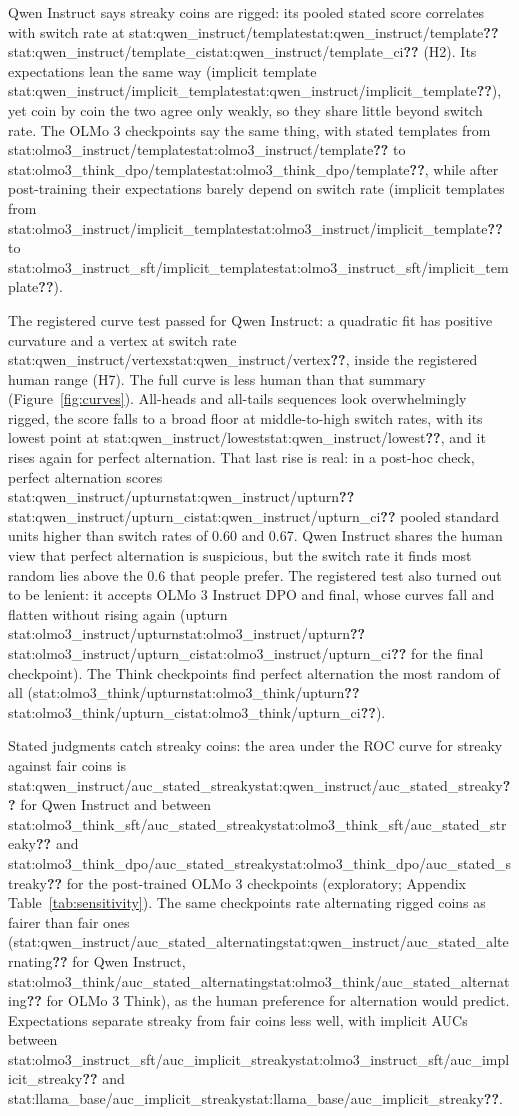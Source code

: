 \documentclass[11pt]{article}
\newcommand{\stat}[1]{\ifcsname stat:#1\endcsname\csname stat:#1\endcsname\else\textbf{??}\fi}
\begin{document}
Qwen Instruct says streaky coins are rigged: its pooled stated score correlates with switch rate at \stat{qwen_instruct/template} \stat{qwen_instruct/template_ci} (H2). Its expectations lean the same way (implicit template \stat{qwen_instruct/implicit_template}), yet coin by coin the two agree only weakly, so they share little beyond switch rate. The OLMo 3 checkpoints say the same thing, with stated templates from \stat{olmo3_instruct/template} to \stat{olmo3_think_dpo/template}, while after post-training their expectations barely depend on switch rate (implicit templates from \stat{olmo3_instruct/implicit_template} to \stat{olmo3_instruct_sft/implicit_template}).

The registered curve test passed for Qwen Instruct: a quadratic fit has positive curvature and a vertex at switch rate \stat{qwen_instruct/vertex}, inside the registered human range (H7). The full curve is less human than that summary (Figure~\ref{fig:curves}). All-heads and all-tails sequences look overwhelmingly rigged, the score falls to a broad floor at middle-to-high switch rates, with its lowest point at \stat{qwen_instruct/lowest}, and it rises again for perfect alternation. That last rise is real: in a post-hoc check, perfect alternation scores \stat{qwen_instruct/upturn} \stat{qwen_instruct/upturn_ci} pooled standard units higher than switch rates of 0.60 and 0.67. Qwen Instruct shares the human view that perfect alternation is suspicious, but the switch rate it finds most random lies above the 0.6 that people prefer. The registered test also turned out to be lenient: it accepts OLMo 3 Instruct DPO and final, whose curves fall and flatten without rising again (upturn \stat{olmo3_instruct/upturn} \stat{olmo3_instruct/upturn_ci} for the final checkpoint). The Think checkpoints find perfect alternation the most random of all (\stat{olmo3_think/upturn} \stat{olmo3_think/upturn_ci}).

Stated judgments catch streaky coins: the area under the ROC curve for streaky against fair coins is \stat{qwen_instruct/auc_stated_streaky} for Qwen Instruct and between \stat{olmo3_think_sft/auc_stated_streaky} and \stat{olmo3_think_dpo/auc_stated_streaky} for the post-trained OLMo 3 checkpoints (exploratory; Appendix Table~\ref{tab:sensitivity}). The same checkpoints rate alternating rigged coins as fairer than fair ones (\stat{qwen_instruct/auc_stated_alternating} for Qwen Instruct, \stat{olmo3_think/auc_stated_alternating} for OLMo 3 Think), as the human preference for alternation would predict. Expectations separate streaky from fair coins less well, with implicit AUCs between \stat{olmo3_instruct_sft/auc_implicit_streaky} and \stat{llama_base/auc_implicit_streaky}.
\end{document}
